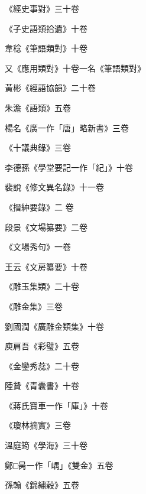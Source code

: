 \begin{pinyinscope}
 《經史事對》三十卷



 《子史語類拾遺》十卷



 韋稔《筆語類對》十卷



 又《應用類對》十卷一名《筆語類對》



 黃彬《經語協韻》二十卷



 朱澹《語類》五卷



 楊名《廣一作「唐」略新書》三卷



 《十議典錄》三卷



 李德孫《學堂要記一作「紀」》十卷



 裴說《修文異名錄》十一卷



 《搢紳要錄》二
 卷



 段景《文場纂要》二卷



 《文場秀句》一卷



 王云《文房纂要》十卷



 《雕玉集類》二十卷



 《雕金集》三卷



 劉國潤《廣雕金類集》十卷



 庾肩吾《彩璧》五卷



 《金鑾秀蕊》二十卷



 陸贄《青囊書》十卷



 《蔣氏寶車一作「庫」》十卷



 《瓊林摘實》三卷



 溫庭筠《學海》三十卷



 鄭□昺一作「嵎」《雙金》五卷



 孫翰《錦繡穀》五卷




\end{pinyinscope}
